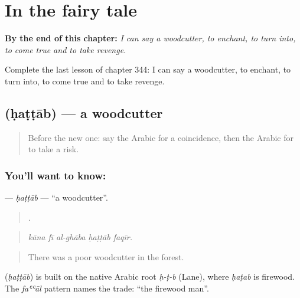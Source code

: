 
\chapter{In the fairy tale}
\label{ch:ar-in-the-fairy-tale}

\begin{chapteropening}
\textbf{By the end of this chapter:} \emph{I can say a woodcutter, to enchant, to turn into, to come true and to take revenge.}

Complete the last lesson of chapter 344: I can say a woodcutter, to enchant, to turn into, to come true and to take revenge.
\end{chapteropening}

\section[\texorpdfstring{\ar{حطاب} (ḥaṭṭāb)}{حطاب (ḥaṭṭāb)}]{ (ḥaṭṭāb) — a woodcutter}

\label{lesson:AR-C344-hattab}



\begin{quote}
Before the new one: say the Arabic for a coincidence, then the Arabic for to take a risk.
\end{quote}

\subsection*{You'll want to know: }
\textbf{} — \emph{ḥaṭṭāb} — \textquotedblleft{}a woodcutter\textquotedblright{}.

\begin{quote}
    .
\end{quote}

\begin{quote}
\emph{kāna fī al-ghāba ḥaṭṭāb faqīr.}
\end{quote}

\begin{quote}
There was a poor woodcutter in the forest.
\end{quote}

\begin{cousinweb}
\textbf{} (\emph{ḥaṭṭāb}) is built on the native Arabic root \emph{ḥ-ṭ-b} (Lane), where \emph{ḥaṭab} is firewood. The \emph{faʿʿāl} pattern names the trade: \textquotedblleft{}the firewood man\textquotedblright{}.
\end{cousinweb}

